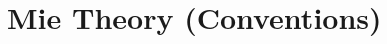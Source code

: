\documentclass[11pt]{Latex/Classes/PhDthesisPSnPDF}
\begin{document}
\appendix

\chapter{Mie Theory (Conventions)}
  \label{app:MieCode}
  


%
%

\setlength{}
\printbibliography

\newpage
\printindex
\end{document}
